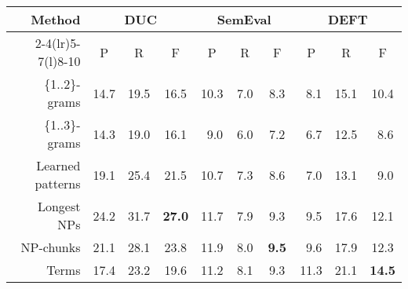       \begin{table*}
        \centering
        \begin{tabular}{@{~}rccccccccc@{~}}
          \toprule
          \multirow{2}{*}[-2pt]{\textbf{Method}} & \multicolumn{3}{c}{\textbf{DUC}} & \multicolumn{3}{c}{\textbf{SemEval}} & \multicolumn{3}{c}{\textbf{DEFT}}\\
          \cmidrule(r){2-4}\cmidrule(lr){5-7}\cmidrule(l){8-10}
          & P & R & F & P & R & F & P & R & F\\
          \midrule
          \{1..2\}-grams & 14.7 & 19.5 & 16.5 & 10.3 & $~~$7.0 & $~~$8.3 & $~~$8.1 & 15.1 & 10.4\\
          \{1..3\}-grams & 14.3 & 19.0 & 16.1 & $~~$9.0 & $~~$6.0 & $~~$7.2 & $~~$6.7 & 12.5 & $~~$8.6\\
          Learned patterns & 19.1 & 25.4 & 21.5 & 10.7 & $~~$7.3 & $~~$8.6 & $~~$7.0 & 13.1 & $~~$9.0\\
          Longest NPs & 24.2 & 31.7 & \textbf{27.0} & 11.7 & $~~$7.9 & $~~$9.3 & $~~$9.5 & 17.6 & 12.1\\
          NP-chunks & 21.1 & 28.1 & 23.8 & 11.9 & $~~$8.0 & \textbf{$~~$9.5} & $~~$9.6 & 17.9 & 12.3\\
          Terms & 17.4 & 23.2 & 19.6 & 11.2 & $~~$8.1 & $~~$9.3 & 11.3 & 21.1 & \textbf{14.5}\\
          \bottomrule
        \end{tabular}
        \caption{Comparison of candidate extraction methods, when extracting 10
                 keyphrases with \textbf{TF-IDF}.
                 \label{tab:tfidf_results}}
      \end{table*}
